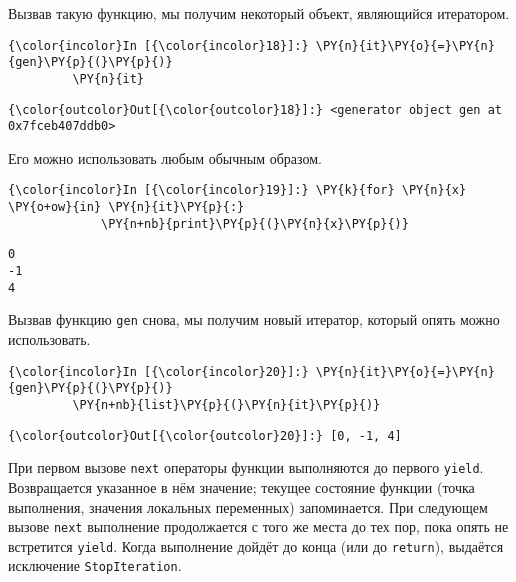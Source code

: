     Вызвав такую функцию, мы получим некоторый объект, являющийся
итератором.

    \begin{Verbatim}[commandchars=\\\{\}]
{\color{incolor}In [{\color{incolor}18}]:} \PY{n}{it}\PY{o}{=}\PY{n}{gen}\PY{p}{(}\PY{p}{)}
         \PY{n}{it}
\end{Verbatim}


\begin{Verbatim}[commandchars=\\\{\}]
{\color{outcolor}Out[{\color{outcolor}18}]:} <generator object gen at 0x7fceb407ddb0>
\end{Verbatim}
            
    Его можно использовать любым обычным образом.

    \begin{Verbatim}[commandchars=\\\{\}]
{\color{incolor}In [{\color{incolor}19}]:} \PY{k}{for} \PY{n}{x} \PY{o+ow}{in} \PY{n}{it}\PY{p}{:}
             \PY{n+nb}{print}\PY{p}{(}\PY{n}{x}\PY{p}{)}
\end{Verbatim}


    \begin{Verbatim}[commandchars=\\\{\}]
0
-1
4

    \end{Verbatim}

    Вызвав функцию \texttt{gen} снова, мы получим новый итератор, который
опять можно использовать.

    \begin{Verbatim}[commandchars=\\\{\}]
{\color{incolor}In [{\color{incolor}20}]:} \PY{n}{it}\PY{o}{=}\PY{n}{gen}\PY{p}{(}\PY{p}{)}
         \PY{n+nb}{list}\PY{p}{(}\PY{n}{it}\PY{p}{)}
\end{Verbatim}


\begin{Verbatim}[commandchars=\\\{\}]
{\color{outcolor}Out[{\color{outcolor}20}]:} [0, -1, 4]
\end{Verbatim}
            
    При первом вызове \texttt{next} операторы функции выполняются до первого
\texttt{yield}. Возвращается указанное в нём значение; текущее состояние
функции (точка выполнения, значения локальных переменных) запоминается.
При следующем вызове \texttt{next} выполнение продолжается с того же
места до тех пор, пока опять не встретится \texttt{yield}. Когда
выполнение дойдёт до конца (или до \texttt{return}), выдаётся исключение
\texttt{StopIteration}.

